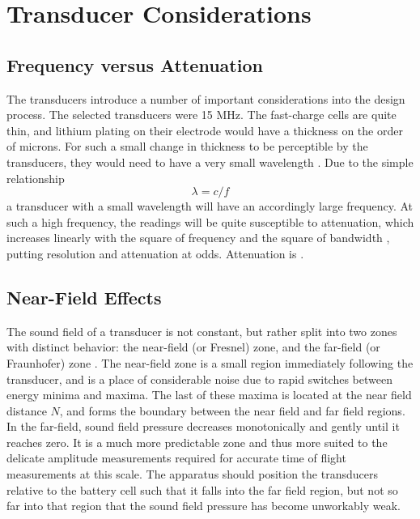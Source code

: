 \section{Transducer Considerations}
\subsection{Frequency versus Attenuation}
The transducers introduce a number of important considerations into the design process.
The selected transducers were 15 MHz. The fast-charge cells are quite thin, and lithium plating on their electrode would have a thickness on the order of microns. 
For such a small change in thickness to be perceptible by the transducers, they would need to have a very small wavelength . Due to the simple relationship 
$$ \lambda = c/f$$
a transducer with a small wavelength will have an accordingly large frequency. At such a high frequency, the readings will be quite susceptible to attenuation, which increases linearly with the square of frequency and the square of bandwidth \cite{OLYMPUS}, putting resolution and attenuation at odds. Attenuation is .

\subsection{Near-Field Effects}
The sound field of a transducer is not constant, but rather split into two zones with distinct behavior: the near-field (or Fresnel) zone, and the far-field (or Fraunhofer) zone \cite{OLYMPUS}. 
The near-field zone is a small region immediately following the transducer, and is a place of considerable noise due to rapid switches between energy minima and maxima. 
The last of these maxima is located at the near field distance $N$, and forms the boundary between the near field and far field regions. \cite{OLYMPUS}
In the far-field, sound field pressure decreases monotonically and gently until it reaches zero. \cite{OLYMPUS}
It is a much more predictable zone and thus more suited to the delicate amplitude measurements required for accurate time of flight measurements at this scale.
The apparatus should position the transducers relative to the battery cell such that it falls into the far field region, but not so far into that region that the sound field pressure has become unworkably weak.

